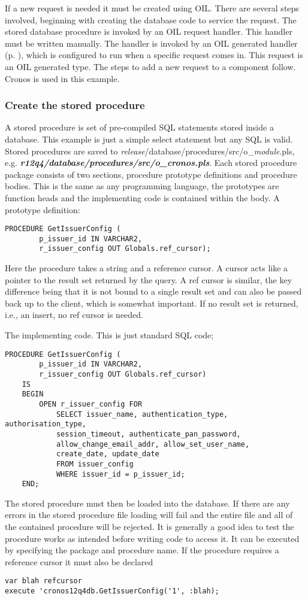 \documentclass[a4paper, 11pt, titlepage]{article}
\begin{document}
If a new request is needed it must be created using OIL. There are several steps involved, beginning with creating the database code to service the request. The stored database procedure is invoked by an OIL request handler. This handler must be written manually. The handler is invoked by an OIL generated handler (p. \pageref{handlerset}), which is configured to run when a specific request comes in. This request is an OIL generated type. The steps to add a new request to a component follow. Cronos is used in this example. 
\subsubsection{Create the stored procedure} 
A stored procedure is set of pre-compiled SQL statements stored inside a database. This example is just a simple select statement but any SQL is valid. Stored procedures are saved to \textit{release}/database/procedures/src/o\_\textit{module}.pls, e.g. \textbf{\textit{r12q4/database/procedures/src/o\_cronos.pls}}. Each stored procedure package consists of two sections, procedure prototype definitions and procedure bodies. This is the same as any programming language, the prototypes are function heads and the implementing code is contained within the body. 
A prototype definition: 
\begin{verbatim} 
PROCEDURE GetIssuerConfig ( 
        p_issuer_id IN VARCHAR2, 
        r_issuer_config OUT Globals.ref_cursor); 
\end{verbatim} 
Here the procedure takes a string and a reference cursor. A cursor acts like a pointer to the result set returned by the query. A ref cursor is similar, the key difference being that it is not bound to a single result set and can also be passed back up to the client, which is somewhat important. If no result set is returned, i.e., an insert, no ref cursor is needed. 

The implementing code. This is just standard SQL code;
\begin{verbatim} 
PROCEDURE GetIssuerConfig ( 
        p_issuer_id IN VARCHAR2, 
        r_issuer_config OUT Globals.ref_cursor) 
    IS 
    BEGIN 
        OPEN r_issuer_config FOR 
            SELECT issuer_name, authentication_type, authorisation_type, 
            session_timeout, authenticate_pan_password, 
            allow_change_email_addr, allow_set_user_name, 
            create_date, update_date 
            FROM issuer_config 
            WHERE issuer_id = p_issuer_id; 
    END; 
\end{verbatim} 
The stored procedure must then be loaded into the database. If there are any errors in the stored procedure file loading will fail and the entire file and all of the contained procedure will be rejected. It is generally a good idea to test the procedure works as intended before writing code to access it. It can be executed by specifying the package and procedure name. If the procedure requires a reference cursor it must also be declared 
\begin{verbatim} 
var blah refcursor 
execute 'cronos12q4db.GetIssuerConfig('1', :blah); 
\end{verbatim} 
 
\end{document}
